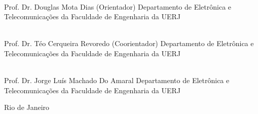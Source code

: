 \begin{flushright}
\parbox{12cm}{

\singlespacing

\hrulefill \\

\vspace{-.4cm}
Prof. Dr. Douglas Mota Dias (Orientador)
\newline
Departamento de Eletrônica e Telecomunicações da Faculdade de Engenharia da UERJ
\vspace{.7cm}

\hrulefill \\

\vspace{-.4cm}
Prof. Dr. Téo Cerqueira Revoredo (Coorientador)
\newline
Departamento de Eletrônica e Telecomunicações da Faculdade de Engenharia da UERJ
\vspace{.7cm}

\hrulefill \\

\vspace{-.4cm}
Prof. Dr. Jorge Luís Machado Do Amaral
\newline
Departamento de Eletrônica e Telecomunicações da Faculdade de Engenharia da UERJ
\vspace{.7cm}

%
%
%

}
\end{flushright}
\vfill

\begin{center}
Rio de Janeiro
\end{center}
